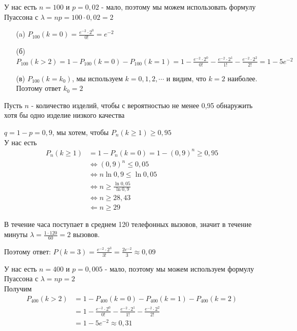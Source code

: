 \begin{exercise}[5]
	У нас есть $n = 100$ и $p=0,02$ - мало, поэтому мы можем использовать формулу Пуассона с $\lambda = np = 100 \cdot 0,02 = 2$
	\begin{enumerate}
		\item [(a)] $P_{100} (k=0) = \frac{e^{-2} \cdot 2^0}{0!} = e^{-2}$
		\item [(б)] $P_{100} (k>2) = 1-P_{100} (k = 0) - P_{100} (k = 1) = 1 - \frac{e^{-2} \cdot 2^0}{0!} - \frac{e^{-2} \cdot 2^1}{1!} - \frac{e^{-2} \cdot 2^2}{2!} = 1 - 5e^{-2}$
		\item [(в)] $P_{100} (k = k_0)$, мы используем $k=0, 1, 2, \cdots$ и видим, что $k=2$ наиболее. Поэтому ответ $k_0 = 2$
	\end{enumerate}
\end{exercise}

\begin{exercise}[6]
	Пусть $n$ - количество изделий, чтобы с вероятностью не менее 0,95 обнаружить хотя бы одно изделие низкого качества
	
	$q = 1-p=0,9$, мы хотем, чтобы $P_n(k \geq 1) \geq 0,95$ \\ У нас есть
	\begin{align*}
		P_n(k \geq 1) & = 1 - P_n(k = 0) = 1 - (0,9)^n \geq 0,95 \\ & \Leftrightarrow (0,9)^n \leq 0,05 \\ & \Leftrightarrow n \ln{0,9} \leq \ln{0,05} \\ & \Leftrightarrow n \geq \frac{\ln{0,05}}{\ln{0,9}} \\ & \Leftrightarrow n \geq 28,43 \\ & \Leftarrow n \geq 29
	\end{align*}
\end{exercise}

\begin{exercise}[7]
	В течение часа поступает в среднем 120 телефонных вызовов, значит в течение минуты $\lambda = \frac{1 \cdot 120}{60} = 2$ вызовов.
	
	Поэтому ответ: $P(k=3) = \frac{e^{-2} \cdot 2^3}{3!} = \frac{2e^{-2}}{3} \approx 0,09$
\end{exercise}

\begin{exercise}[8]
	У нас есть $n=400$ и $p=0,005$ - мало, поэтому мы можем используем формулу Пуассона с $\lambda = np = 2$ \\ Получим
	\begin{align*}
		P_{400} (k > 2) & = 1 - P_{400}(k=0) - P_{400}(k=1) - P_{400}(k=2) \\ & = 1 - \frac{e^{-2} \cdot 2^0}{0!} - \frac{e^{-2} \cdot 2^1}{1!} - \frac{e^{-2} \cdot 2^2}{2!} \\ & = 1 - 5e^{-2} \approx 0,31
	\end{align*}
\end{exercise}

